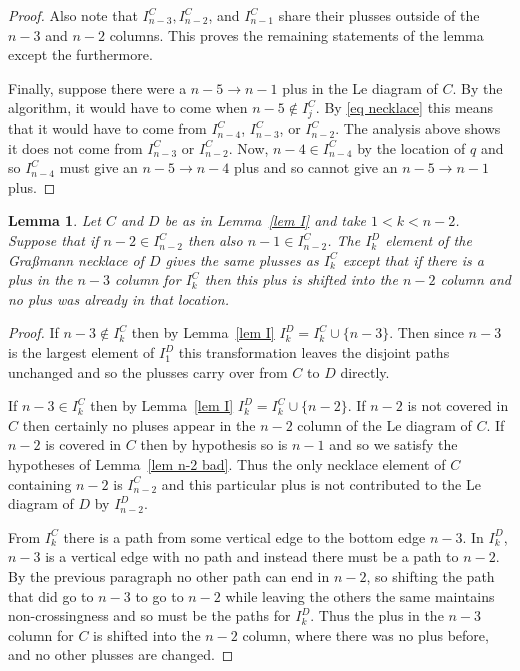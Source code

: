 \documentclass[11pt]{article}
\newtheorem{lem}[thm]{Lemma}
\theoremstyle{remark}
\theoremstyle{definition}
\begin{document}
\begin{proof}
  Also note that $I_{n-3}^{C}, I_{n-2}^{C}$, and $I_{n-1}^{C}$ share their plusses outside of the $n-3$ and $n-2$ columns.  This proves the remaining statements of the lemma except the furthermore.

  Finally, suppose there were a $n-5\rightarrow n-1$ plus in the Le diagram of $C$.  By the algorithm, it would have to come when $n-5 \not\in I_j^{C}$.  By \eqref{eq necklace} this means that it would have to come from $I_{n-4}^{C}$, $I_{n-3}^{C}$, or $I_{n-2}^{C}$. The analysis above shows it does not come from $I_{n-3}^{C}$ or $I_{n-2}^{C}$.   Now, $n-4\in I_{n-4}^{C}$ by the location of $q$ and so $I_{n-4}^{C}$ must give an $n-5\rightarrow n-4$ plus and so cannot give an $n-5\rightarrow n-1$ plus.

\end{proof}


\begin{lem}\label{lem other k}
  Let $C$ and $D$ be as in Lemma~\ref{lem I} and take $1<k<n-2$.  Suppose that if $n-2\in I_{n-2}^{C}$ then also $n-1\in I_{n-2}^{C}$.
  The $I_k^{D}$ element of the Gra\ss mann necklace of $D$ gives the same plusses as $I_{k}^{C}$ except that if there is a plus in the $n-3$ column for $I_{k}^{C}$ then this plus is shifted into the $n-2$ column and no plus was already in that location.
\end{lem}

\begin{proof}
  If $n-3\not\in I_{k}^{C}$ then by Lemma~\ref{lem I} $I_{k}^{D} = I_k^{C}\cup \{n-3\}$.  Then since $n-3$ is the largest element of $I_1^{D}$ this transformation leaves the disjoint paths unchanged and so the plusses carry over from $C$ to $D$ directly.

  If $n-3\in I_{k}^{C}$ then by Lemma~\ref{lem I} $I_{k}^{D} = I_k^{C}\cup \{n-2\}$.  If $n-2$ is not covered in $C$ then certainly no pluses appear in the $n-2$ column of the Le diagram of $C$.  If $n-2$ is covered in $C$ then by hypothesis so is $n-1$ and so we satisfy the hypotheses of Lemma~\ref{lem n-2 bad}.  Thus the only necklace element of $C$ containing $n-2$ is $I_{n-2}^{C}$ and this particular plus is not contributed to the Le diagram of $D$ by $I_{n-2}^{D}$.

  {}From $I_{k}^{C}$ there is a path from some vertical edge to the bottom edge $n-3$.  In $I_{k}^{D}$, $n-3$ is a vertical edge with no path and instead there must be a path to $n-2$.  By the previous paragraph no other path can end in $n-2$, so shifting the path that did go to $n-3$ to go to $n-2$ while leaving the others the same maintains non-crossingness and so must be the paths for $I_{k}^{D}$.  Thus the plus in the $n-3$ column for $C$ is shifted into the $n-2$ column, where there was no plus before, and no other plusses are changed.
\end{proof}
\end{document}
